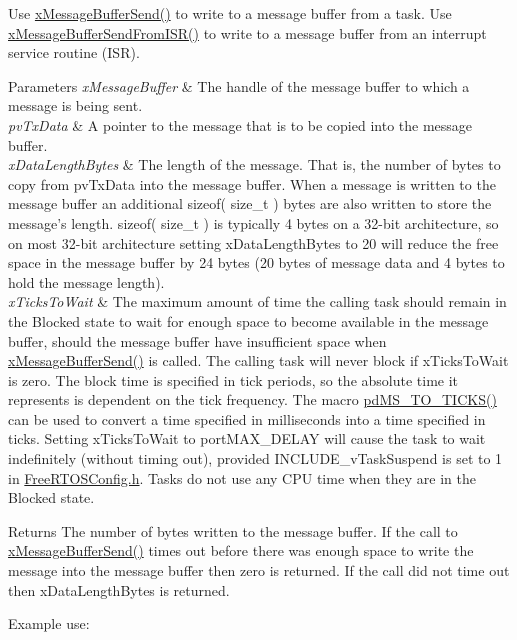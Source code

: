 \begin{DoxyPre}
\begin{DoxyPre}   Use \mbox{\hyperlink{message__buffer_8h_a858f6da6fe24a226c45caf1634ea1605}{xMessageBufferSend()}} to write to a message buffer from a task.  Use
   \mbox{\hyperlink{message__buffer_8h_aeef5b0c4f8c2db6ca2230a8874813e79}{xMessageBufferSendFromISR()}} to write to a message buffer from an interrupt
   service routine (ISR).\end{DoxyPre}
\end{DoxyPre}



\begin{DoxyPre}
\begin{DoxyPre}
\begin{DoxyParams}{Parameters}
{\em xMessageBuffer} & The handle of the message buffer to which a message is
   being sent.\\
\hline
{\em pvTxData} & A pointer to the message that is to be copied into the
   message buffer.\\
\hline
{\em xDataLengthBytes} & The length of the message.  That is, the number of
   bytes to copy from pvTxData into the message buffer.  When a message is
   written to the message buffer an additional sizeof( size\_t ) bytes are also
   written to store the message's length.  sizeof( size\_t ) is typically 4 bytes
   on a 32-bit architecture, so on most 32-bit architecture setting
   xDataLengthBytes to 20 will reduce the free space in the message buffer by 24
   bytes (20 bytes of message data and 4 bytes to hold the message length).\\
\hline
{\em xTicksToWait} & The maximum amount of time the calling task should remain
   in the Blocked state to wait for enough space to become available in the
   message buffer, should the message buffer have insufficient space when
   \mbox{\hyperlink{message__buffer_8h_a858f6da6fe24a226c45caf1634ea1605}{xMessageBufferSend()}} is called.  The calling task will never block if
   xTicksToWait is zero.  The block time is specified in tick periods, so the
   absolute time it represents is dependent on the tick frequency.  The macro
   \mbox{\hyperlink{projdefs_8h_a353d0f62b82a402cb3db63706c81ec3f}{pdMS\_TO\_TICKS()}} can be used to convert a time specified in milliseconds into
   a time specified in ticks.  Setting xTicksToWait to portMAX\_DELAY will cause
   the task to wait indefinitely (without timing out), provided
   INCLUDE\_vTaskSuspend is set to 1 in \mbox{\hyperlink{_free_r_t_o_s_config_8h}{FreeRTOSConfig.h}}.  Tasks do not use any
   CPU time when they are in the Blocked state.\\
\hline
\end{DoxyParams}
\begin{DoxyReturn}{Returns}
The number of bytes written to the message buffer.  If the call to
   \mbox{\hyperlink{message__buffer_8h_a858f6da6fe24a226c45caf1634ea1605}{xMessageBufferSend()}} times out before there was enough space to write the
   message into the message buffer then zero is returned.  If the call did not
   time out then xDataLengthBytes is returned.
\end{DoxyReturn}
Example use:


\end{DoxyPre}
\end{DoxyPre}
